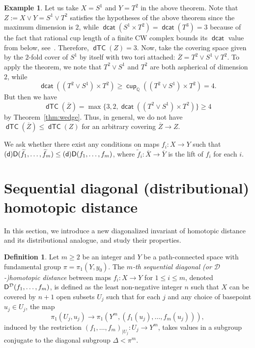 \documentclass[amscd,amssymb,verbatim,10pt]{amsart}
\numberwithin{equation}{section}
\theoremstyle{plain}
\theoremstyle{definition}
\newtheorem{definition}[theorem]{Definition}
\newtheorem{ex}[theorem]{Example}
\DeclareMathOperator{\cu}{{\mathsf{cup}}}
\DeclareMathOperator{\dcat}{{\mathsf{dcat}}}
\DeclareMathOperator{\dTC}{{\mathsf{dTC}}}
\def\Q{{\mathbb Q}}
\newcommand{\D}{{\sf {D}}}
\newcommand{\sd}{{(\sf {d})}}
\newcommand{\cD}{{\mathcal{D}}}
\def\wt{\widetilde}
\begin{document}
\begin{ex}\label{exam:nocover}
Let us take $X=S^1$ and $Y=T^2$ in the above theorem. Note that $Z:= X\vee Y=S^1 \vee T^2$ satisfies the hypotheses of the above theorem
since the maximum dimension is $2$, while $\dcat(S^1 \times T^2)=\dcat(T^3)=3$ because of the fact that rational cup length of a finite CW complex bounds its $\dcat$ value from below, see~\cite[Subsection~4.2]{DJ}. Therefore, $\dTC(Z)=3$. Now, take the covering space given by the $2$-fold cover of $S^1$ by itself with 
two tori attached: $\overline Z = T^2 \vee S^1 \vee T^2$. To apply the theorem,
we note that $T^2 \vee S^1$ and $T^2$ are both aspherical of dimension $2$, while
$$\dcat((T^2 \vee S^1) \times T^2) \geq \cu_\Q((T^2 \vee S^1)\times T^2)
= 4.$$
But then we have 
\[
\dTC(\overline Z) = \max \{3,2,\dcat((T^2 \vee S^1) \times T^2)\}
\geq 4
\]
by Theorem~\ref{thm:wedge}. Thus, in general, we do not have $\dTC(\overline Z) \leq \dTC(Z)$ for an arbitrary covering $\overline Z \to Z$.
\end{ex}

We ask whether there exist any conditions on maps $f_i\colon X \to Y$ such that
$\sd\D(\wt f_1, \dots,\wt f_m) \leq \sd\D(f_1,\dots,f_m)$, where $\wt f_i\colon \overline X \to \overline Y$ is the lift of $f_i$ for each $i$.


\section{Sequential diagonal (distributional) homotopic distance}\label{sec:dhd}

In this section, we introduce a new diagonalized invariant of homotopic distance and its distributional analogue, and study their properties.

\begin{definition}\label{def:tcd} 
Let $m\ge 2$ be an integer and $Y$ be a path-connected space with fundamental group
$\pi = \pi_1(Y,y_0)$. The $m$\emph{-th sequential diagonal (or $\cD$-)homotopic distance} between maps $f_i\colon X \to Y$ for $1\le i \le m$, denoted $\D^\cD(f_1,\dots,f_m)$, is defined as the least non-negative integer $n$ such that $X$ can be covered by $n +1$ 
open subsets $U_j$ such that for each $j$ and any choice of basepoint $u_j\in U_j$, the map 
\[
\pi_1\left(U_j, u_j\right) \longrightarrow 
\pi_1\left(Y^m, \left(f_1(u_j),\dots,f_m(u_j)\right)\right),
\]
induced by the restriction $(f_1,\dots,f_m)_{|U_j}\colon U_j\to Y^m$, takes
values in a subgroup conjugate to the diagonal subgroup $\Delta < \pi^m$.
\end{definition}
\end{document}

